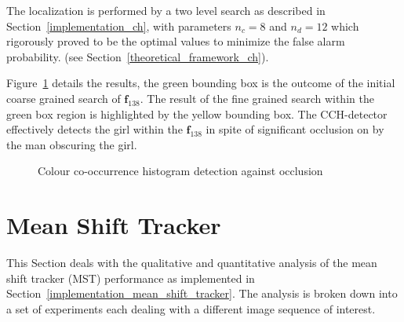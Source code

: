 The localization is performed by a two level search as described in
Section~\ref{implementation_ch}, with parameters $n_c=8$ and $n_d=12$
which~\cite{Chang1999} rigorously proved to be the optimal values to minimize
the false alarm probability. (see Section~\ref{theoretical_framework_ch}).

Figure~\ref{fig:ch_partial_occlusion} details the results, the green bounding
box is the outcome of the initial coarse grained search of $\mathbf{f}_{138}$.
The result of the fine grained search within the green box region is highlighted
by the yellow bounding box. 
The CCH-detector effectively detects the girl within the $\mathbf{f}_{138}$ in
spite of significant occlusion on by the man obscuring the girl. 

\begin{figure}     
    \caption{Colour co-occurrence histogram detection against occlusion\label{fig:ch_partial_occlusion}
    }
\end{figure}

\section{Mean Shift Tracker}\label{results_mean_shift_tracker}
This Section deals with the qualitative and quantitative analysis of the mean
shift tracker (MST) performance as implemented in
Section~\ref{implementation_mean_shift_tracker}. The analysis is broken down
into a set of experiments each dealing with a different image sequence of
interest.

